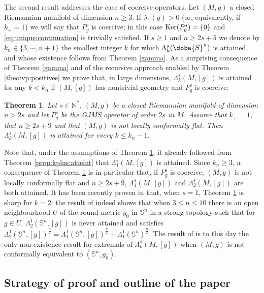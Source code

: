 \documentclass[10pt]{amsart}
\numberwithin{equation}{section}
\def\La{{\Lambda}}
\gdef\mS{\doba{S}}
\def\ker{{\mathop{\rm Ker}}}
\theoremstyle{plain}
\newtheorem{theo}{Theorem}[section]%
\theoremstyle{remark}
\begin{document}
\medskip


The second result addresses the case of coercive operators. Let $(M,g)$ a closed Riemannian manifold of dimension $n \ge 3$. If $\lambda_1(g) >0$ (or, equivalently, if $k_+ = 1$) we will say that $P_g^s$ is coercive; in this case $\ker(P_g^s) = \{0\}$ and \eqref{eq:unique:continuation} is trivially satisfied.  If $s \ge1 $ and $n \ge 2s+5$ we denote by $k_n \in \{3, \cdots, n+1\}$ the smallest integer $k$ for which   $\La_{k}^s(\mS^n)$ is attained, and whose existence follows from Theorem \ref{gamma}.  As a surprising consequence of Theorem \ref{gamma} and of the recursive approach enabled by Theorem \ref{theo:vp:positives} we prove that, in large dimensions, $\Lambda_k^s(M,[g])$ is attained  for any $k < k_n$ if $(M,[g])$ has nontrivial geometry and $P_g^s$ is coercive:
\begin{theo} \label{noncf}
Let $s \in \mathbb{N}^*$, $(M,g)$ be a closed Riemannian manifold of dimension $n > 2s$ and let $P_g^s$ be the GJMS operator of order $2s$ in $M$. Assume that $k_+ = 1$, that $n \ge 2s+9$ and that $(M,g)$ is not locally conformally flat. Then $\La_k^s(M,[g])$ is attained for every $k\le k_n-1$. 
\end{theo}
Note that, under the assumptions of Theorem \ref{noncf}, it already followed from Theorem \ref{prop:kplus:atteint} that $\Lambda_1^s(M,[g])$ is attained. Since $k_n \ge 3$, a consequence of Theorem \ref{noncf} is in particular that, if $P_g^s$ is coercive, $(M,g)$ is not locally conformally flat and $n \ge 2s+9$, $\Lambda_1^s(M,[g])$ and $\Lambda_2^s(M,[g])$ are both attained. It has been recently proven in \cite{PremoselliVetois4} that, when $s=1$, Theorem \ref{noncf} is sharp for $k=2$: the result of  \cite{PremoselliVetois4} indeed shows that when $3 \le n \le 10$ there is an open neighbourhood $U$ of the round metric $g_0$ in $\mathbb{S}^n$ in a strong topology such that for $g \in U$, $\Lambda_2^1(\mathbb{S}^n, [g])$ is never attained and satisfies $\Lambda_2^1(\mathbb{S}^n, [g])^{\frac{n}{2}} =\Lambda_1^1(\mathbb{S}^n, [g])^{\frac{n}{2}} + \Lambda_1^1(\mathbb{S}^n)^{\frac{n}{2}}$. The result of \cite{PremoselliVetois4} is to this day the only non-existence result for extremals of $\Lambda_k^s(M,[g])$ when $(M,g)$ is not conformally equivalent to $(\mathbb{S}^n, g_0)$. 



\medskip



\subsection{Strategy of proof and outline of the paper}
\end{document}
